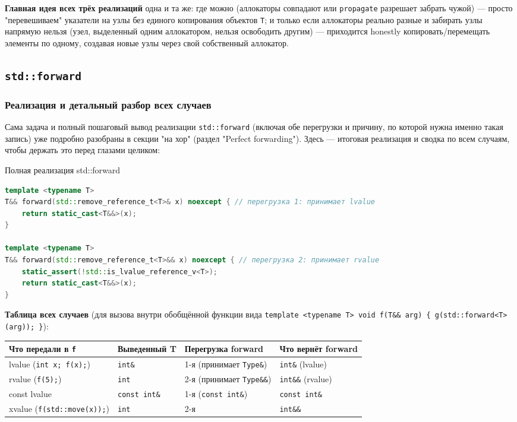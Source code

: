 \textbf{Главная идея всех трёх реализаций} одна и та же: где можно (аллокаторы совпадают или \texttt{propagate} разрешает забрать чужой) --- просто "перевешиваем" указатели на узлы без единого копирования объектов \texttt{T}; и только если аллокаторы реально разные и забирать узлы напрямую нельзя (узел, выделенный одним аллокатором, нельзя освободить другим) --- приходится honestly копировать/перемещать элементы по одному, создавая новые узлы через свой собственный аллокатор.

\subsection{\texttt{std::forward}}
\subsubsection{Реализация и детальный разбор всех случаев}
Сама задача и полный пошаговый вывод реализации \texttt{std::forward} (включая обе перегрузки и причину, по которой нужна именно такая запись) уже подробно разобраны в секции "на хор" (раздел "Perfect forwarding"). Здесь --- итоговая реализация и сводка по всем случаям, чтобы держать это перед глазами целиком:
\begin{implementation}{Полная реализация std::forward}{}
\begin{lstlisting}[language=C++]
template <typename T>
T&& forward(std::remove_reference_t<T>& x) noexcept { // перегрузка 1: принимает lvalue
    return static_cast<T&&>(x);
}

template <typename T>
T&& forward(std::remove_reference_t<T>&& x) noexcept { // перегрузка 2: принимает rvalue
    static_assert(!std::is_lvalue_reference_v<T>);
    return static_cast<T&&>(x);
}
\end{lstlisting}
\end{implementation}
\textbf{Таблица всех случаев} (для вызова внутри обобщённой функции вида \texttt{template <typename T> void f(T\&\& arg) \{ g(std::forward<T>(arg)); \}}):
\begin{center}
\begin{tabular}{|l|l|l|l|}
\hline
\textbf{Что передали в \texttt{f}} & \textbf{Выведенный T} & \textbf{Перегрузка forward} & \textbf{Что вернёт forward} \\
\hline
lvalue (\texttt{int x; f(x);}) & \texttt{int\&} & 1-я (принимает \texttt{Type\&}) & \texttt{int\&} (lvalue) \\
rvalue (\texttt{f(5);}) & \texttt{int} & 2-я (принимает \texttt{Type\&\&}) & \texttt{int\&\&} (rvalue) \\
const lvalue & \texttt{const int\&} & 1-я (\texttt{const int\&}) & \texttt{const int\&} \\
xvalue (\texttt{f(std::move(x));}) & \texttt{int} & 2-я & \texttt{int\&\&} \\
\hline
\end{tabular}
\end{center}
